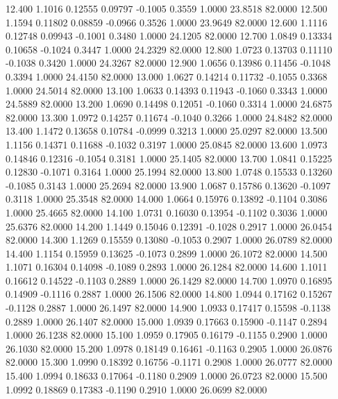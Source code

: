   12.400   1.1016   0.12555   0.09797  -0.1005   0.3559   1.0000  23.8518  82.0000
  12.500   1.1594   0.11802   0.08859  -0.0966   0.3526   1.0000  23.9649  82.0000
  12.600   1.1116   0.12748   0.09943  -0.1001   0.3480   1.0000  24.1205  82.0000
  12.700   1.0849   0.13334   0.10658  -0.1024   0.3447   1.0000  24.2329  82.0000
  12.800   1.0723   0.13703   0.11110  -0.1038   0.3420   1.0000  24.3267  82.0000
  12.900   1.0656   0.13986   0.11456  -0.1048   0.3394   1.0000  24.4150  82.0000
  13.000   1.0627   0.14214   0.11732  -0.1055   0.3368   1.0000  24.5014  82.0000
  13.100   1.0633   0.14393   0.11943  -0.1060   0.3343   1.0000  24.5889  82.0000
  13.200   1.0690   0.14498   0.12051  -0.1060   0.3314   1.0000  24.6875  82.0000
  13.300   1.0972   0.14257   0.11674  -0.1040   0.3266   1.0000  24.8482  82.0000
  13.400   1.1472   0.13658   0.10784  -0.0999   0.3213   1.0000  25.0297  82.0000
  13.500   1.1156   0.14371   0.11688  -0.1032   0.3197   1.0000  25.0845  82.0000
  13.600   1.0973   0.14846   0.12316  -0.1054   0.3181   1.0000  25.1405  82.0000
  13.700   1.0841   0.15225   0.12830  -0.1071   0.3164   1.0000  25.1994  82.0000
  13.800   1.0748   0.15533   0.13260  -0.1085   0.3143   1.0000  25.2694  82.0000
  13.900   1.0687   0.15786   0.13620  -0.1097   0.3118   1.0000  25.3548  82.0000
  14.000   1.0664   0.15976   0.13892  -0.1104   0.3086   1.0000  25.4665  82.0000
  14.100   1.0731   0.16030   0.13954  -0.1102   0.3036   1.0000  25.6376  82.0000
  14.200   1.1449   0.15046   0.12391  -0.1028   0.2917   1.0000  26.0454  82.0000
  14.300   1.1269   0.15559   0.13080  -0.1053   0.2907   1.0000  26.0789  82.0000
  14.400   1.1154   0.15959   0.13625  -0.1073   0.2899   1.0000  26.1072  82.0000
  14.500   1.1071   0.16304   0.14098  -0.1089   0.2893   1.0000  26.1284  82.0000
  14.600   1.1011   0.16612   0.14522  -0.1103   0.2889   1.0000  26.1429  82.0000
  14.700   1.0970   0.16895   0.14909  -0.1116   0.2887   1.0000  26.1506  82.0000
  14.800   1.0944   0.17162   0.15267  -0.1128   0.2887   1.0000  26.1497  82.0000
  14.900   1.0933   0.17417   0.15598  -0.1138   0.2889   1.0000  26.1407  82.0000
  15.000   1.0939   0.17663   0.15900  -0.1147   0.2894   1.0000  26.1238  82.0000
  15.100   1.0959   0.17905   0.16179  -0.1155   0.2900   1.0000  26.1030  82.0000
  15.200   1.0978   0.18149   0.16461  -0.1163   0.2905   1.0000  26.0876  82.0000
  15.300   1.0990   0.18392   0.16756  -0.1171   0.2908   1.0000  26.0777  82.0000
  15.400   1.0994   0.18633   0.17064  -0.1180   0.2909   1.0000  26.0723  82.0000
  15.500   1.0992   0.18869   0.17383  -0.1190   0.2910   1.0000  26.0699  82.0000
